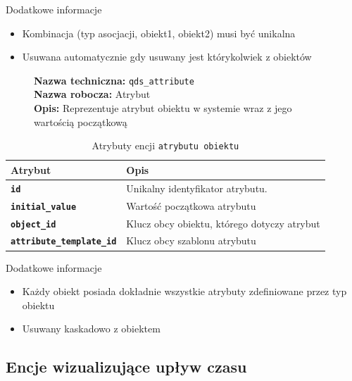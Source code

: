 Dodatkowe informacje
\begin{itemize}
    \item Kombinacja (typ asocjacji, obiekt1, obiekt2) musi być unikalna
    \item Usuwana automatycznie gdy usuwany jest którykolwiek z obiektów
\end{itemize}

\begin{figure}[H]
    \centering
    \begin{minipage}{0.8\textwidth} 
        \begin{framed}
            \noindent\textbf{\large Nazwa techniczna:} \texttt{qds\_attribute} \\
            \textbf{\large Nazwa robocza:} Atrybut \\
            \textbf{\large Opis:} Reprezentuje atrybut obiektu w systemie wraz z jego wartością początkową
        \end{framed}
    \end{minipage}
\end{figure}

\begin{table}[H]
    \centering
    \renewcommand{\arraystretch}{1.6}
    \begin{tabular}{|>{\bfseries}l|p{}|}
        \hline
        \rowcolor[HTML]{EFEFEF} \textbf{Atrybut} & \textbf{Opis} \\
        \hline
        \texttt{id} & Unikalny identyfikator atrybutu. \\
        \hline
        \texttt{initial\_value} & Wartość początkowa atrybutu \\
        \hline
        \texttt{object\_id} & Klucz obcy obiektu, którego dotyczy atrybut \\
        \hline
        \texttt{attribute\_template\_id} & Klucz obcy szablonu atrybutu \\
        \hline
    \end{tabular}
    \caption{Atrybuty encji \texttt{atrybutu obiektu}}
\end{table}

Dodatkowe informacje
\begin{itemize}
    \item Każdy obiekt posiada dokładnie wszystkie atrybuty zdefiniowane przez typ obiektu
    \item Usuwany kaskadowo z obiektem
\end{itemize}

\subsection{Encje wizualizujące upływ czasu}

